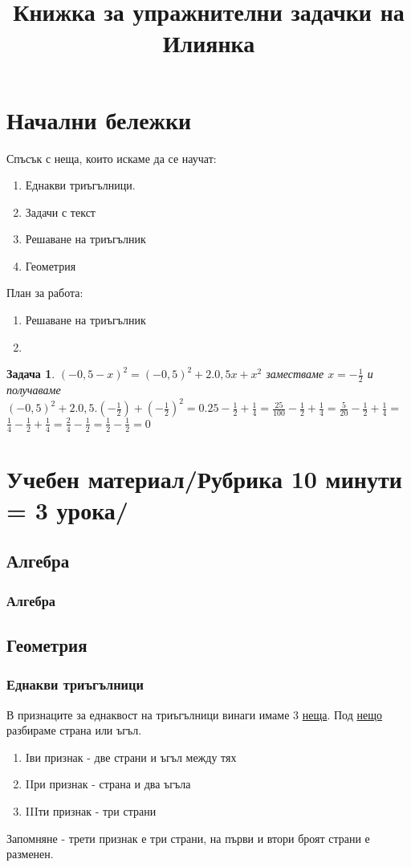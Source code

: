\documentclass{article}
\date{}
\title{Книжка за упражнителни задачки на Илиянка}
\newtheorem{problem}{Задача}
\begin{document}
	
	
	\maketitle
	\tableofcontents
	
	\section{Начални бележки}
	Спъсък с неща, които искаме да се научат:
	\begin{enumerate}
		\item Еднакви триъгълници.
		\item Задачи с текст
		\item Решаване на триъгълник
		\item Геометрия
		
		
	\end{enumerate}
	План за работа:
	\begin{enumerate}
		\item Решаване на триъгълник
		\item 
	\end{enumerate}
	
	\begin{problem}
		$(-0,5-x)^2 = (-0,5)^2 + 2.0,5x + x^2$ заместваме $x = -\frac{1}{2} $ и получаваме
	 $(-0,5)^2 + 2.0,5.(-\frac{1}{2}) + (-\frac{1}{2})^2 = 0.25 -\frac{1}{2} + \frac{1}{4}= \frac{25}{100}-\frac{1}{2} + \frac{1}{4} = \frac{5}{20}-\frac{1}{2} + \frac{1}{4} =$ \\
	 $\frac{1}{4}-\frac{1}{2} + \frac{1}{4} = \frac{2}{4} - \frac{1}{2}= \frac{1}{2} - \frac{1}{2} = 0 $ 
\end{problem}
	\section{Учебен материал/Рубрика 10 минути = 3 урока/}
	\subsection{Алгебра}
	\subsubsection{Алгебра}
	\subsection{Геометрия}
	\subsubsection{Еднакви триъгълници}
	В признаците за еднаквост на триъгълници винаги имаме 3 \underline{неща}. Под \underline{нещо} разбираме страна или ъгъл. 
	\begin{enumerate}
		\item Iви признак - две страни и ъгъл между тях
		\item IIри признак - страна и два ъгъла
		\item IIIти признак - три страни
	\end{enumerate}
	Запомняне - трети признак е три страни, на първи и втори броят страни е разменен.
\end{document}
